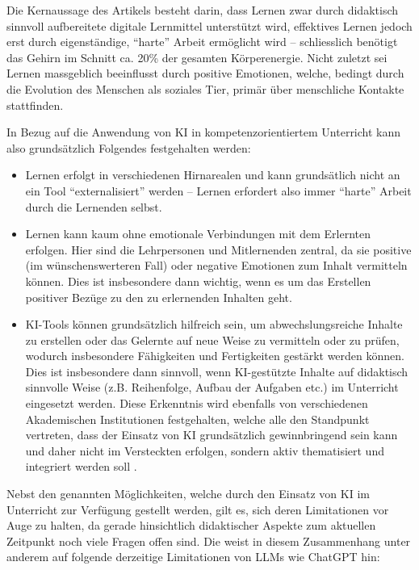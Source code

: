 Die Kernaussage des Artikels besteht darin, dass Lernen zwar durch didaktisch sinnvoll aufbereitete digitale Lernmittel unterstützt wird, effektives Lernen jedoch erst durch eigenständige, \enquote{harte} Arbeit ermöglicht wird -- schliesslich benötigt das Gehirn im Schnitt ca. 20\% der gesamten Körperenergie. Nicht zuletzt sei Lernen massgeblich beeinflusst durch positive Emotionen, welche, bedingt durch die Evolution des Menschen als soziales Tier, primär über menschliche Kontakte stattfinden.

In Bezug auf die Anwendung von \gls{KI} in kompetenzorientiertem Unterricht kann also grundsätzlich Folgendes festgehalten werden:

\begin{itemize}
    \item Lernen erfolgt in verschiedenen Hirnarealen und kann grundsätlich nicht an ein Tool \enquote{externalisiert} werden -- Lernen erfordert also immer \enquote{harte} Arbeit durch die Lernenden selbst.
    \item Lernen kann kaum ohne emotionale Verbindungen mit dem Erlernten erfolgen. Hier sind die Lehrpersonen und Mitlernenden zentral, da sie positive (im wünschenswerteren Fall) oder negative Emotionen zum Inhalt vermitteln können. Dies ist insbesondere dann wichtig, wenn es um das Erstellen positiver Bezüge zu den zu erlernenden Inhalten geht.
    \item \gls{KI}-Tools können grundsätzlich hilfreich sein, um abwechslungsreiche Inhalte zu erstellen oder das Gelernte auf neue Weise zu vermitteln oder zu prüfen, wodurch insbesondere Fähigkeiten und Fertigkeiten gestärkt werden können. Dies ist insbesondere dann sinnvoll, wenn \gls{KI}-gestützte Inhalte auf didaktisch sinnvolle Weise (z.B. Reihenfolge, Aufbau der Aufgaben etc.) im Unterricht eingesetzt werden. Diese Erkenntnis wird ebenfalls von verschiedenen Akademischen Institutionen festgehalten, welche alle den Standpunkt vertreten, dass der Einsatz von \gls{KI} grundsätzlich gewinnbringend sein kann und daher nicht im Versteckten erfolgen, sondern aktiv thematisiert und integriert werden soll \cite{bbz,bfh}.
\end{itemize}

Nebst den genannten Möglichkeiten, welche durch den Einsatz von \gls{KI} im Unterricht zur Verfügung gestellt werden, gilt es, sich deren Limitationen vor Auge zu halten, da gerade hinsichtlich didaktischer Aspekte zum aktuellen Zeitpunkt noch viele Fragen offen sind. Die \textcite{bfh} weist in diesem Zusammenhang unter anderem auf folgende derzeitige Limitationen von \glspl{LLM} wie ChatGPT hin:


